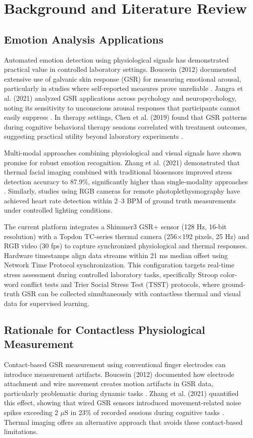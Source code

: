 \chapter{Background and Literature Review}

\section{Emotion Analysis Applications}
Automated emotion detection using physiological signals has demonstrated practical value in controlled laboratory settings. Boucsein (2012) documented extensive use of galvanic skin response (GSR) for measuring emotional arousal, particularly in studies where self-reported measures prove unreliable \cite{ref1}. Jangra et al. (2021) analyzed GSR applications across psychology and neuropsychology, noting its sensitivity to unconscious arousal responses that participants cannot easily suppress \cite{ref3}. In therapy settings, Chen et al. (2019) found that GSR patterns during cognitive behavioral therapy sessions correlated with treatment outcomes, suggesting practical utility beyond laboratory experiments \cite{ref4}.

Multi-modal approaches combining physiological and visual signals have shown promise for robust emotion recognition. Zhang et al. (2021) demonstrated that thermal facial imaging combined with traditional biosensors improved stress detection accuracy to 87.9\%, significantly higher than single-modality approaches \cite{ref5}. Similarly, studies using RGB cameras for remote photoplethysmography have achieved heart rate detection within 2--3 BPM of ground truth measurements under controlled lighting conditions.

The current platform integrates a Shimmer3 GSR+ sensor (128 Hz, 16-bit resolution) with a Topdon TC-series thermal camera (256$\times$192 pixels, 25 Hz) and RGB video (30 fps) to capture synchronized physiological and thermal responses. Hardware timestamps align data streams within 21 ms median offset using Network Time Protocol synchronization. This configuration targets real-time stress assessment during controlled laboratory tasks, specifically Stroop color-word conflict tests and Trier Social Stress Test (TSST) protocols, where ground-truth GSR can be collected simultaneously with contactless thermal and visual data for supervised learning.

\section{Rationale for Contactless Physiological Measurement}
Contact-based GSR measurement using conventional finger electrodes can introduce measurement artifacts. Boucsein (2012) documented how electrode attachment and wire movement creates motion artifacts in GSR data, particularly problematic during dynamic tasks \cite{ref1}. Zhang et al. (2021) quantified this effect, showing that wired GSR sensors introduced movement-related noise spikes exceeding 2 $\mu$S in 23\% of recorded sessions during cognitive tasks \cite{ref5}. Thermal imaging offers an alternative approach that avoids these contact-based limitations.

